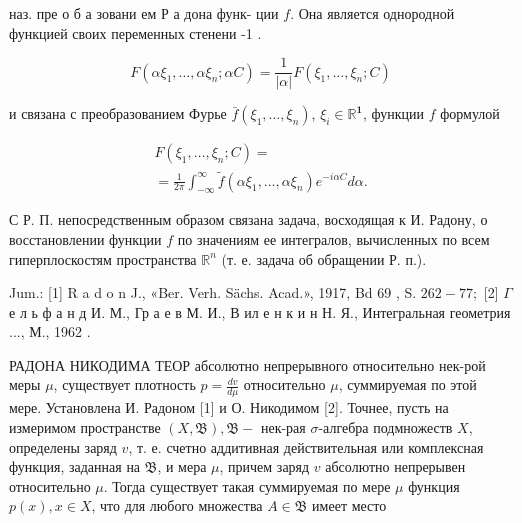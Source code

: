 \documentclass[10pt]{article}
\begin{document}
наз. пре о б а зовани ем Р а дона функ- ции $f$. Она является однородной функцией своих переменных стенени -1 .



\[

F\left(\alpha \xi_{1}, \ldots, \alpha \xi_{n} ; \alpha C\right)=\frac{1}{|\alpha|} F\left(\xi_{1}, \ldots, \xi_{n} ; C\right)

\]



и связана с преобразованием Фурье $\bar{f}\left(\xi_{1}, \ldots, \xi_{n}\right)$, $\xi_{i} \in \mathbb{R}^{\mathbf{1}}$, функции $f$ формулой



\[

\begin{gathered}

F\left(\xi_{1}, \ldots, \xi_{n} ; C\right)= \\

=\frac{1}{2 \pi} \int_{-\infty}^{\infty} \tilde{f}\left(\alpha \xi_{1}, \ldots, \alpha \xi_{n}\right) e^{-i \alpha C} d \alpha .

\end{gathered}

\]



С Р. П. непосредственным образом связана задача, восходящая к И. Радону, о восстановлении функции $f$ по значениям ее интегралов, вычисленных по всем гиперплоскостям пространства $\mathbb{R}^{n}$ (т. е. задача об обращении Р. п.).



Jum.: [1] R a d o n J., «Ber. Verh. Sächs. Acad.», 1917, Bd 69 , S. $262-77 ;$ [2] $\Gamma$ е л ь ф а н д И. М., Гр а е в М. И., В ил е н к и н Н. Я., Интегральная геометрия ..., М., 1962 .



РАДОНА НИКОДИМА ТЕОР абсолютно непрерывного относительно нек-рой меры $\mu$, существует плотность $p=\frac{d v}{d \mu}$ относительно $\mu$, суммируемая по этой мере. Установлена И. Радоном [1] и О. Никодимом [2]. Точнее, пусть на измеримом пространстве $(X, \mathfrak{B}), \mathfrak{B}-$ нек-рая $\sigma$-алгебра подмножеств $X$, определены заряд $v$, т. е. счетно аддитивная действительная или комплексная функция, заданная на $\mathfrak{B}$, и мера $\mu$, причем заряд $v$ абсолютно непрерывен относительно $\mu$. Тогда существует такая суммируемая по мере $\mu$ функция $p(x), x \in X$, что для любого множества $A \in \mathfrak{B}$ имеет место
\end{document}

